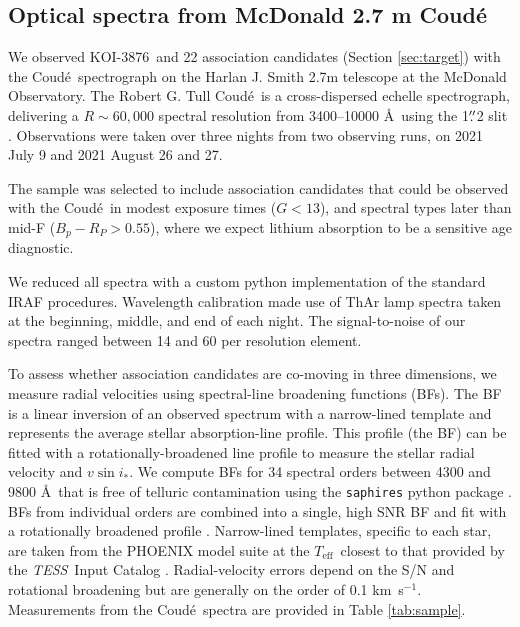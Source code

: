 \documentclass[twocolumn, linenumbers]{aastex631}
\newcommand{\name}{KOI-3876}
\newcommand{\vsini}{$v\sin{i_*}$}
\newcommand{\teff}{\ensuremath{T_{\text{eff}}}}
\newcommand\kms{km~s$^{-1}$}
\newcommand{\tess}{\textit{TESS}}
\newcommand{\coude}{Coud{\'e}}
\begin{document}
\subsection{Optical spectra from McDonald 2.7 m \coude}\label{sec:tull}

We observed \name\ and 22 association candidates (Section \ref{sec:target}) with the \coude\ spectrograph on the Harlan J. Smith 2.7m telescope at the McDonald Observatory. The Robert G. Tull \coude\ is a cross-dispersed echelle spectrograph, delivering a $R\sim60,000$ spectral resolution from 3400--10000 \AA\ using the 1$\mbox{$.\!\!^{\prime\prime}$}$2 slit \citep{Tull1995}. Observations were taken over three nights from two observing runs, on 2021 July 9 and 2021 August 26 and 27. 

The sample was selected to include association candidates that could be observed with the \coude\ in modest exposure times ($G<13$), and spectral types later than mid-F ($B_p-R_P > 0.55$), where we expect lithium absorption to be a sensitive age diagnostic. 

We reduced all spectra with a custom python implementation of the standard IRAF procedures. Wavelength calibration made use of ThAr lamp spectra taken at the beginning, middle, and end of each night. The signal-to-noise of our spectra ranged between 14 and 60 per resolution element. 

To assess whether association candidates are co-moving in three dimensions, we measure radial velocities using spectral-line broadening functions (BFs). The BF is a linear inversion of an observed spectrum with a narrow-lined template and represents the average stellar absorption-line profile. This profile (the BF) can be fitted with a rotationally-broadened line profile to measure the stellar radial velocity and \vsini. We compute BFs for 34 spectral orders between 4300 and 9800 \AA\ that is free of telluric contamination using the {\tt saphires} python package \citep{Tofflemireetal2019}. BFs from individual orders are combined into a single, high SNR BF and fit with a rotationally broadened profile \citep{Gray1992}. Narrow-lined templates, specific to each star, are taken from the \citet{2013A&A...553A...6H} PHOENIX model suite at the \teff\ closest to that provided by the \tess\ Input Catalog \citep[v8.0;][]{TIC2019}. Radial-velocity errors depend on the S/N and rotational broadening but are generally on the order of 0.1 \kms. Measurements from the \coude\ spectra are provided in Table \ref{tab:sample}.
\end{document}
